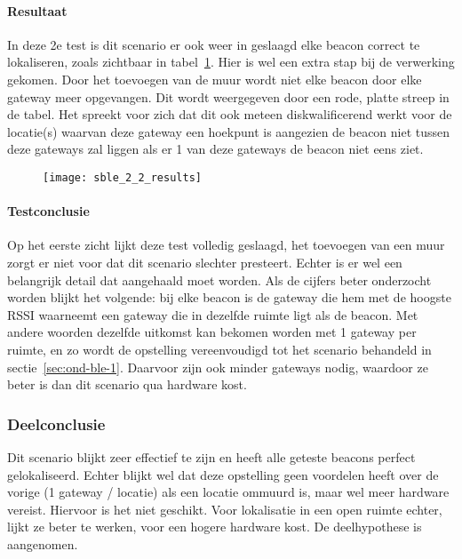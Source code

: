 \paragraph{Resultaat}
In deze 2e test is dit scenario er ook weer in geslaagd elke beacon correct te lokaliseren, zoals zichtbaar in tabel~\ref{fig:ond-ble-static-2-2-res}. Hier is wel een extra stap bij de verwerking gekomen. Door het toevoegen van de muur wordt niet elke beacon door elke gateway meer opgevangen. Dit wordt weergegeven door een rode, platte streep in de tabel. Het spreekt voor zich dat dit ook meteen diskwalificerend werkt voor de locatie(s) waarvan deze gateway een hoekpunt is aangezien de beacon niet tussen deze gateways zal liggen als er 1 van deze gateways de beacon niet eens ziet.

\begin{figure}[h]
	\texttt{[image: sble\_2\_2\_results]}
	\label{fig:ond-ble-static-2-2-res}
\end{figure}

\paragraph{Testconclusie}
Op het eerste zicht lijkt deze test volledig geslaagd, het toevoegen van een muur zorgt er niet voor dat dit scenario slechter presteert. Echter is er wel een belangrijk detail dat aangehaald moet worden. Als de cijfers beter onderzocht worden blijkt het volgende: bij elke beacon is de gateway die hem met de hoogste RSSI waarneemt een gateway die in dezelfde ruimte ligt als de beacon. Met andere woorden dezelfde uitkomst kan bekomen worden met 1 gateway per ruimte, en zo wordt de opstelling vereenvoudigd tot het scenario behandeld in sectie~\ref{sec:ond-ble-1}. Daarvoor zijn ook minder gateways nodig, waardoor ze beter is dan dit scenario qua hardware kost.

\subsubsection{Deelconclusie}
Dit scenario blijkt zeer effectief te zijn en heeft alle geteste beacons perfect gelokaliseerd. Echter blijkt wel dat deze opstelling geen voordelen heeft over de vorige (1 gateway / locatie) als een locatie ommuurd is, maar wel meer hardware vereist. Hiervoor is het niet geschikt. Voor lokalisatie in een open ruimte echter, lijkt ze beter te werken, voor een hogere hardware kost. De deelhypothese is aangenomen.

